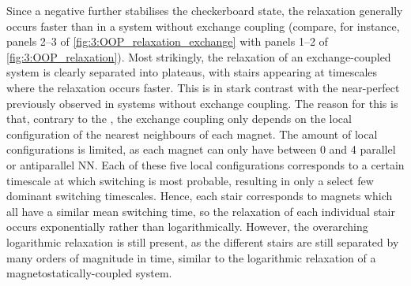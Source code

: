 \vspace{-1em}

Since a negative  further stabilises the checkerboard state, the relaxation generally occurs faster than in a system without exchange coupling (compare, for instance, panels 2--3 of \cref{fig:3:OOP_relaxation_exchange} with panels 1--2 of \cref{fig:3:OOP_relaxation}).
Most strikingly, the relaxation of an exchange-coupled system is clearly separated into plateaus, with stairs appearing at timescales where the relaxation occurs faster.
This is in stark contrast with the near-perfect  previously observed in systems without exchange coupling.
The reason for this is that, contrary to the , the exchange coupling only depends on the local configuration of the nearest neighbours of each magnet.
The amount of local configurations is limited, as each magnet can only have between 0 and 4 parallel or antiparallel NN.
Each of these five local configurations corresponds to a certain timescale at which switching is most probable, resulting in only a select few dominant switching timescales.
Hence, each stair corresponds to magnets which all have a similar mean switching time, so the relaxation of each individual stair occurs exponentially rather than logarithmically.
However, the overarching logarithmic relaxation is still present, as the different stairs are still separated by many orders of magnitude in time, similar to the logarithmic relaxation of a magnetostatically-coupled system. \\\par

